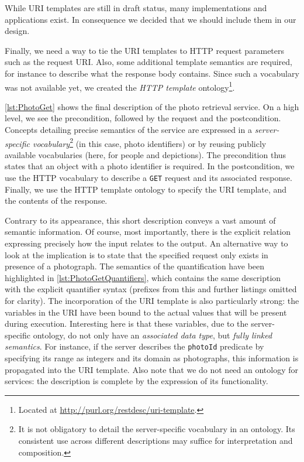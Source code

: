 \documentclass[smallextended]{svjour3}
\begin{document}
{While URI templates are still in draft status, many implementations and applications exist. In consequence we decided that we should include them in our design.

Finally, we need a way to tie the URI templates to HTTP request parameters such as the request URI. Also, some additional template semantics are required, for instance to describe what the response body contains. Since such a vocabulary was not available yet, we created the \emph{HTTP template} ontology\footnote{Located at {\fontsize{8}{10}\url{http://purl.org/restdesc/uri-template}}.}.

\autoref{lst:PhotoGet} shows the final description of the photo retrieval service. On a high level, we see the precondition, followed by the request and the postcondition. Concepts detailing precise semantics of the service are expressed in a \emph{server-specific vocabulary}\footnote{It is not obligatory to detail the server-specific vocabulary in an ontology. Its consistent use across different descriptions may suffice for interpretation and composition.} (in this case, photo identifiers) or by reusing publicly available vocabularies (here, for people and depictions).
The precondition thus states that an object with a photo identifier is required. In the postcondition, we use the HTTP vocabulary to describe a \Verb!GET! request and its associated response. Finally, we use the HTTP template ontology to specify the URI template, and the contents of the response.

Contrary to its appearance, this short description conveys a vast amount of semantic information. Of course, most importantly, there is the explicit relation expressing precisely how the input relates to the output. An alternative way to look at the implication is to state that the specified request only exists in presence of a photograph. The semantics of the quantification have been highlighted in \autoref{lst:PhotoGetQuantifiers}, which contains the same description with the explicit quantifier syntax (prefixes from this and further listings omitted for clarity). The incorporation of the URI template is also particularly strong: the variables in the URI have been bound to the actual values that will be present during execution. Interesting here is that these variables, due to the server-specific ontology, do not only have an \emph{associated data type}, but \emph{fully linked semantics}. For instance, if the server describes the \Verb!photoId! predicate by specifying its range as integers and its domain as photographs, this information is propagated into the URI template. \label{SemanticTemplateURI} Also note that we do not need an ontology for services: the description is complete by the expression of its functionality.

}
\end{document}

